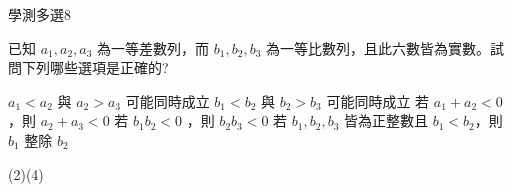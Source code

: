     \begin{QUESTION}
        \begin{ExamInfo}{97}{學測}{多選}{8}
        \end{ExamInfo}
        \begin{ExamAnsRateInfo}{36}{57}{36}{15}
        \end{ExamAnsRateInfo}
        \begin{QBODY}
            已知 $a_1 , a_2 , a_3$ 為一等差數列，而 $b_1 , b_2 , b_3$ 為一等比數列，且此六數皆為實數。試問下列哪些選項是正確的?
			\begin{QOPS} 
				\QOP  $a_1 <a_2$ 與 $a_2 >a_3$ 可能同時成立 
				\QOP $b_1 <b_2$ 與 $b_2 >b_3$ 可能同時成立 \quad 
				\QOP 若 $a_1 +a_2 <0$，則 $a_2 +a_3 <0$ 
				\QOP 若 $b_1b_2 <0$ ，則 $b_2b_3 <0$ 
				\QOP 若 $b_1,b_2,b_3$ 皆為正整數且 $b_1 <b_2$，則 $b_1$ 整除 $b_2$
			\end{QOPS}
        \end{QBODY}
        \begin{QFROMS}
        \end{QFROMS}
        \begin{QTAGS}\end{QTAGS}
        \begin{QANS}
            (2)(4)
        \end{QANS}
        \begin{QSOLLIST}
        \end{QSOLLIST}
        \begin{QEMPTYSPACE}
        \end{QEMPTYSPACE}
    \end{QUESTION}
